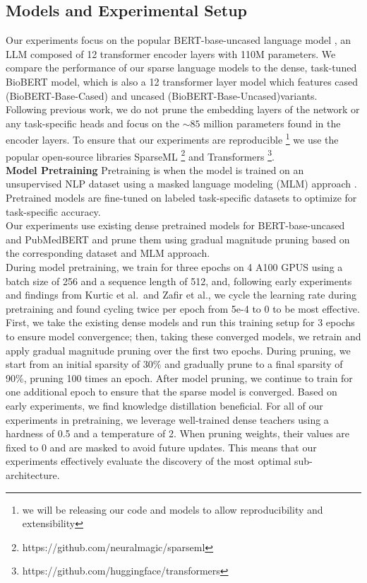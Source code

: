 \subsection{Models and Experimental Setup}
Our experiments focus on the popular BERT-base-uncased language model \cite{Devlin2019BERTPO}, an LLM composed of 12 transformer encoder layers with 110M parameters. We compare the performance of our sparse language models to the dense, task-tuned BioBERT model, which is also a 12 transformer layer model which features cased (BioBERT-Base-Cased) and uncased (BioBERT-Base-Uncased)variants. Following previous work, we do not prune the embedding layers of the network or any task-specific heads and focus on the $\sim\!85$ million parameters found in the encoder layers. To ensure that our experiments are reproducible \footnote{we will be releasing our code and models to allow reproducibility and extensibility} we use the popular open-source libraries SparseML \footnote{https://github.com/neuralmagic/sparseml} and Transformers \footnote{https://github.com/huggingface/transformers}. \\
\textbf{Model Pretraining}
Pretraining is when the model is trained on an unsupervised NLP dataset using a masked language modeling (MLM) approach \cite{Devlin2019BERTPO}. Pretrained models are fine-tuned on labeled task-specific datasets to optimize for task-specific accuracy.\\
Our experiments use existing dense pretrained models for BERT-base-uncased \cite{Devlin2019BERTPO} and PubMedBERT \cite{Gu2022DomainSpecificLM} and prune them using gradual magnitude pruning based on the corresponding dataset and MLM approach. \\
During model pretraining, we train for three epochs on 4 A100 GPUS using a batch size of 256 and a sequence length of 512, and, following early experiments and findings from Kurtic et al.\ and Zafir et al., we cycle the learning rate during pretraining and found cycling twice per epoch from 5e-4 to 0 to be most effective. First, we take the existing dense models and run this training setup for 3 epochs to ensure model convergence; then, taking these converged models, we retrain and apply gradual magnitude pruning over the first two epochs. During pruning, we start from an initial sparsity of $30\%$ and gradually prune to a final sparsity of 90\%, pruning 100 times an epoch. After model pruning, we continue to train for one additional epoch to ensure that the sparse model is converged. 
Based on early experiments, we find knowledge distillation beneficial. For all of our experiments in pretraining, we leverage well-trained dense teachers using a hardness of  0.5 and a temperature of 2. When pruning weights, their values are fixed to 0 and are masked to avoid future updates. This means that our experiments effectively evaluate the discovery of the most optimal sub-architecture.
